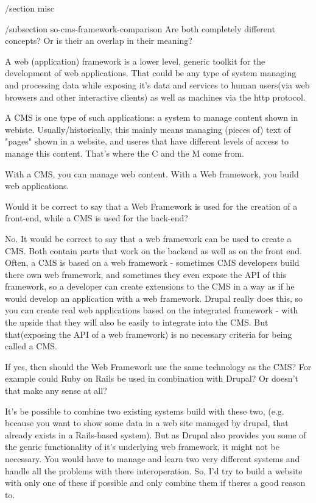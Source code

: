 /section {misc}

/subsection {so-cms-framework-comparison}
Are both completely different concepts? Or is their an overlap in their meaning?

A web (application) framework is a lower level, generic toolkit for the development of web applications. That could be
any type of system managing and processing data while exposing it's data and services to human users(via web browsers
and other interactive clients) as well as machines via the http protocol.

A CMS is one type of such applications: a system to manage content shown in webiste. Usually/historically, this mainly
means managing (pieces of) text of "pages" shown in a website, and useres that have different levels of access to
manage this content. That's where the C and the M come from.

With a CMS, you can manage web content. With a Web framework, you build web applications.

Would it be correct to say that a Web Framework is used for the creation of a front-end, while a CMS is used for the
back-end?

No. It would be correct to say that a web framework can be used to create a CMS. Both contain parts that work on the
backend as well as on the front end. Often, a CMS is based on a web framework - sometimes CMS developers build there own
web framework, and sometimes they even expose the API of this framework, so a developer can create extensions to the CMS
in a way as if he would develop an application with a web framework. Drupal really does this, so you can create real web
applications based on the integrated framework - with the upside that they will also be easily to integrate into the
CMS. But that(exposing the API of a web framework) is no necessary criteria for being called a CMS.

If yes, then should the Web Framework use the same technology as the CMS? For example could Ruby on Rails be used in
combination with Drupal? Or doesn't that make any sense at all?

It's be possible to combine two existing systems build with these two, (e.g. because you want to show some data in a web
site managed by drupal, that already exists in a Rails-based system). But as Drupal also provides you some of the genric
functionality of it's underlying web framework, it might not be necessary. You would have to manage and learn two very
different systems and handle all the problems with there interoperation. So, I'd try to build a website with only one of
these if possible and only combine them if theres a good reason to.